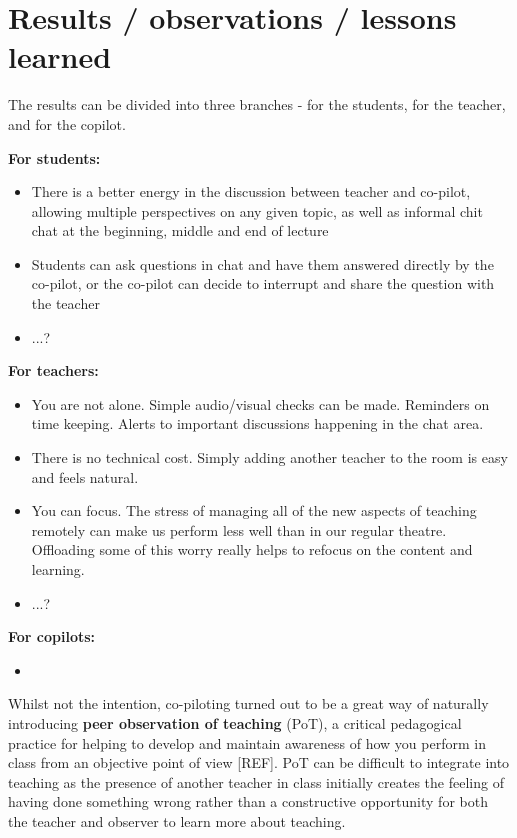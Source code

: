 \documentclass{article}
\begin{document}
\section*{Results / observations / lessons learned}
The results can be divided into three branches - for the students, for the teacher, and for the copilot.

\textbf{For students:}
\begin{itemize}
    \item There is a better energy in the discussion between teacher and co-pilot, allowing multiple perspectives on any given topic, as well as informal chit chat at the beginning, middle and end of lecture
    \item Students can ask questions in chat and have them answered directly by the co-pilot, or the co-pilot can decide to interrupt and share the question with the teacher
    \item ...?
\end{itemize}

\textbf{For teachers:}
\begin{itemize}
    \item You are not alone. Simple audio/visual checks can be made. Reminders on time keeping. Alerts to important discussions happening in the chat area.
    \item There is no technical cost. Simply adding another teacher to the room is easy and feels natural.
    \item You can focus. The stress of managing all of the new aspects of teaching remotely can make us perform less well than in our regular theatre. Offloading some of this worry really helps to refocus on the content and learning.
    \item ...?
\end{itemize}

\textbf{For copilots:}
\begin{itemize}
    \item
\end{itemize}

Whilst not the intention, co-piloting turned out to be a great way of naturally introducing \textbf{peer observation of teaching} (PoT), a critical pedagogical practice for helping to develop and maintain awareness of how you perform in class from an objective point of view [REF]. PoT can be difficult to integrate into teaching as the presence of another teacher in class initially creates the feeling of having done something wrong rather than a constructive opportunity for both the teacher and observer to learn more about teaching.
\end{document}
